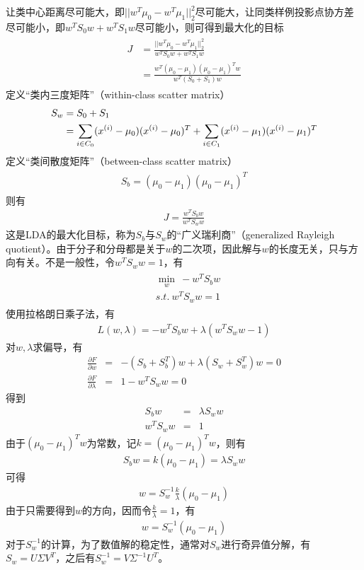 让类中心距离尽可能大，即$||w^T\mu_0-w^T\mu_1||^2_2$尽可能大，让同类样例投影点协方差尽可能小，即$w^TS_0w+w^TS_1w$尽可能小，则可得到最大化的目标
\begin{eqnarray}
\begin{aligned}
J&=\frac{||w^T\mu_0-w^T\mu_1||^2_2}{w^TS_0w+w^TS_1w}\\
&=\frac{w^T(\mu_0-\mu_1)(\mu_0-\mu_1)^Tw}{w^T(S_0+S_1)w}
\end{aligned}
\end{eqnarray}
定义“类内三度矩阵”（within-class scatter matrix）
\begin{eqnarray}
\begin{aligned}
S_w &=S_0+S_1\\
&=\sum_{i\in C_0}({x}^{({i})}-\mu_0)({x}^{({i})}-\mu_0)^T+\sum_{i\in C_1}({x}^{({i})}-\mu_1)({x}^{({i})}-\mu_1)^T
\end{aligned}
\end{eqnarray}
定义“类间散度矩阵”（between-class scatter matrix）
\begin{eqnarray}
\begin{aligned}
S_b=(\mu_0-\mu_1)(\mu_0-\mu_1)^T
\end{aligned}
\end{eqnarray}
则有
\begin{eqnarray}
J=\frac{w^TS_bw}{w^TS_ww}
\end{eqnarray}
这是LDA的最大化目标，称为$S_b$与$S_w$的“广义瑞利商”（generalized Rayleigh quotient）。由于分子和分母都是关于$w$的二次项，因此解与$w$的长度无关，只与方向有关。不是一般性，令$w^TS_ww=1$，有
\begin{eqnarray}
\begin{aligned}
&\min_w\ -w^TS_bw\\
&s.t.\ w^TS_ww=1
\end{aligned}
\end{eqnarray}
使用拉格朗日乘子法，有
\begin{eqnarray}
L(w,\lambda)=-w^TS_bw+\lambda(w^TS_ww-1)
\end{eqnarray}
对$w,\lambda$求偏导，有
\begin{eqnarray}
\frac{\partial F}{\partial w}&=&-(S_b+S_b^T)w+\lambda(S_w+S_w^T)w=0\\
\frac{\partial F}{\partial \lambda}&=&1-w^TS_ww=0
\end{eqnarray}
得到
\begin{eqnarray}
S_bw&=&\lambda S_ww\\
w^TS_ww&=&1
\end{eqnarray}
由于$(\mu_0-\mu_1)^Tw$为常数，记$k=(\mu_0-\mu_1)^Tw$，则有
\begin{eqnarray}
S_bw=k(\mu_0-\mu_1)=\lambda S_ww
\end{eqnarray}
可得
\begin{eqnarray}
w=S_w^{-1}\frac{k}{\lambda}(\mu_0-\mu_1)
\end{eqnarray}
由于只需要得到$w$的方向，因而令$\frac{k}{\lambda}=1$，有
\begin{eqnarray}
w=S_w^{-1}(\mu_0-\mu_1)
\end{eqnarray}
对于$S_w^{-1}$的计算，为了数值解的稳定性，通常对$S_w$进行奇异值分解，有
$S_w=U\Sigma V^T$，之后有$S_w^{-1}=V\Sigma^{-1}U^T$。

